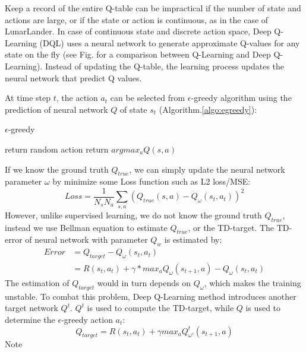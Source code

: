 \documentclass[conference]{IEEEtran}
\begin{document}
Keep a record of the entire Q-table can be impractical if the number of state and actions are large, or if the state or action is continuous, as in the case of LunarLander. In case of continuous state and discrete action space, Deep Q-Learning (DQL)\cite{mnih2015human} uses a neural network to generate approximate Q-values for any state on the fly (see Fig. for a comparison between Q-Learning and Deep Q-Learning). Instead of updating the Q-table, the learning process updates the neural network that predict Q values.

At time step $t$, the action $a_t$ can be selected from $\epsilon$-greedy algorithm using the prediction of neural network $Q$ of state $s_t$ (Algorithm.\ref{algo:egreedy}):

\begin{algorithm}[h!]
	\caption{$\epsilon$-greedy}
	\begin{algorithmic}
		\State return random action
		\Else
		\State return $argmax_a Q(s, a)$
		\EndIf
		\EndFunction
	\end{algorithmic}
	\label{algo:egreedy}
\end{algorithm}

If we know the ground truth $Q_{true}$, we can simply update the neural network parameter $\omega$ by minimize some Loss function such as L2 loss/MSE:
\begin{equation}
Loss = \frac{1}{N_sN_a}\sum_{s,a}(Q_{true}(s, a) - Q_\omega(s_t, a_t))^2
\end{equation}
However, unlike supervised learning, we do not know the ground truth $Q_{true}$, instead we use Bellman equation to estimate $Q_{true}$, or the TD-target. The TD-error of neural network with parameter $Q_w$ is estimated by:
\begin{align}
Error &= Q_{target} - Q_\omega(s_t, a_t)  \\
&= R(s_t, a_t) + \gamma * max_a Q_{\omega}(s_{t+1}, a) - Q_\omega(s_t, a_t)
\end{align}
The estimation of $Q_{target}$ would in turn depends on $Q_\omega$, which makes the training unstable. To combat this problem, Deep Q-Learning method introduces another target network $Q^t$. $Q^t$ is used to compute the TD-target, while $Q$ is used to determine the 
$\epsilon$-greedy action $a_t$:
\begin{equation}
Q_{target} = R(s_t, a_t) + \gamma max_a Q^t_{\omega'}(s_{t+1}, a)
\label{eq:tdtarget}
\end{equation}
Note 
\end{document}
